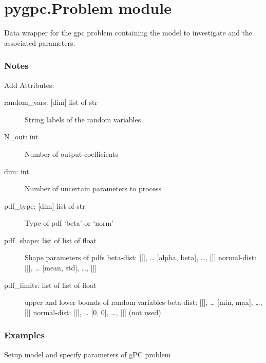 \documentclass[letterpaper,10pt,english,openany,oneside]{sphinxmanual}
\begin{document}
\section{pygpc.Problem module}
\label{\detokenize{pygpc:module-pygpc.Problem}}\label{\detokenize{pygpc:pygpc-problem-module}}

\begin{fulllineitems}
\label{\detokenize{pygpc:pygpc.Problem.Problem}}
Data wrapper for the gpc problem containing the model to investigate and the associated parameters.
\subsubsection*{Notes}

Add Attributes:
\begin{description}
\item[{random\_vars: {[}dim{]} list of str}] \leavevmode
String labels of the random variables

\item[{N\_out: int}] \leavevmode
Number of output coefficients

\item[{dim: int}] \leavevmode
Number of uncertain parameters to process

\item[{pdf\_type: {[}dim{]} list of str}] \leavevmode
Type of pdf ‘beta’ or ‘norm’

\item[{pdf\_shape: list of list of float}] \leavevmode
Shape parameters of pdfs
beta-dist:   {[}{[}{]}, … {[}alpha, beta{]}, …, {[}{]}{]}
normal-dist: {[}{[}{]}, … {[}mean, std{]}, …, {[}{]}{]}

\item[{pdf\_limits: list of list of float}] \leavevmode
upper and lower bounds of random variables
beta-dist:   {[}{[}{]}, … {[}min, max{]}, …, {[}{]}{]}
normal-dist: {[}{[}{]}, … {[}0, 0{]}, …, {[}{]}{]} (not used)

\end{description}
\subsubsection*{Examples}

Setup model and specify parameters of gPC problem


\end{fulllineitems}
\end{document}
